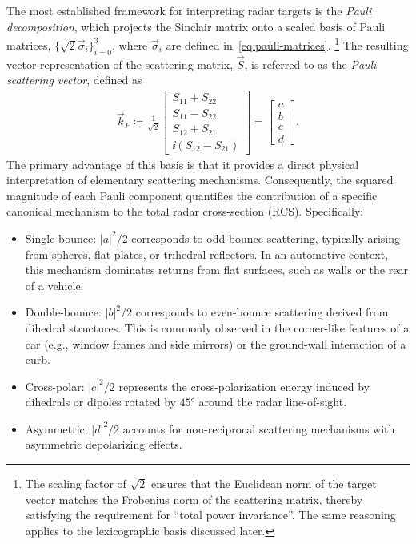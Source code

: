 The most established framework for interpreting radar targets is the \emph{Pauli decomposition}, which projects the Sinclair matrix onto a scaled basis of Pauli matrices, $\{\sqrt{2}\vec\sigma_i\}_{i=0}^3$, where $\vec\sigma_i$ are defined in~\cref{eq:pauli-matrices}.%
    \footnote{
        The scaling factor of $\sqrt{2}$ ensures that the Euclidean norm of the target vector matches the Frobenius norm of the scattering matrix, thereby satisfying the requirement for \enquote{total power invariance}.
        The same reasoning applies to the lexicographic basis discussed later.
    }
The resulting vector representation of the scattering matrix, $\vec S$, is referred to as the \emph{Pauli scattering vector}, defined as
\begin{align}
    \label{eq:pauli-vector-4d}
    \vec k_P \coloneq \frac{1}{\sqrt{2}} \begin{bmatrix}
        S_{11} + S_{22} \\
        S_{11} - S_{22} \\
        S_{12} + S_{21} \\
        \ii(S_{12} - S_{21})
    \end{bmatrix} = \begin{bmatrix} a \\ b \\ c \\ d \end{bmatrix}.
\end{align}
The primary advantage of this basis is that it provides a direct physical interpretation of elementary scattering mechanisms.
Consequently, the squared magnitude of each Pauli component quantifies the contribution of a specific canonical mechanism to the total radar cross-section (RCS).
Specifically:
\begin{itemize}
    \item Single-bounce: $|a|^2/2$ corresponds to odd-bounce scattering, typically arising from spheres, flat plates, or trihedral reflectors.
    In an automotive context, this mechanism dominates returns from flat surfaces, such as walls or the rear of a vehicle.
    \item Double-bounce: $|b|^2/2$ corresponds to even-bounce scattering derived from dihedral structures.
    This is commonly observed in the corner-like features of a car (e.g., window frames and side mirrors) or the ground-wall interaction of a curb.
    \item Cross-polar: $|c|^2/2$ represents the cross-polarization energy induced by dihedrals or dipoles rotated by $\ang{45}$ around the radar line-of-sight.
    \item Asymmetric: $|d|^2/2$ accounts for non-reciprocal scattering mechanisms with asymmetric depolarizing effects.
\end{itemize}

